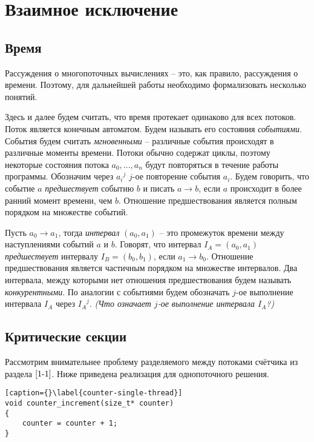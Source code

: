 \section{Взаимное исключение}

\subsection{Время}

Рассуждения о многопоточных вычислениях -- это, как правило, рассуждения о
времени. Поэтому, для дальнейшей работы необходимо формализовать несколько
понятий.

Здесь и далее будем считать, что время протекает одинаково для всех потоков.
Поток является конечным автоматом. Будем называть его состояния
\textit{событиями}. События будем считать \textit{мгновенными} -- различные
события происходят в различные моменты времени. Потоки обычно содержат циклы,
поэтому некоторые состояния потока $a_0,...,a_n$ будут повторяться в течение
работы программы. Обозначим через ${a_{i}}^{j}$ $j$-ое повторение события $a_i$.
Будем говорить, что событие $a$ \textit{предшествует} событию $b$ и писать
$a \rightarrow b$, если $a$ происходит в более ранний момент времени, чем $b$.
Отношение предшествования является полным порядком на множестве событий.

Пусть $a_0 \rightarrow a_1$, тогда \textit{интервал} $(a_0,a_1)$ -- это
промежуток времени между наступлениями событий $a$ и $b$. Говорят, что интервал
$I_A=(a_0,a_1)$ \textit{предшествует} интервалу $I_B=(b_0,b_1)$, если
$a_1 \rightarrow b_0$. Отношение предшествования является частичным порядком на
множестве интервалов. Два интервала, между которыми нет отношения
предшествования будем называть \textit{конкурентными}. По аналогии с событиями
будем обозначать $j$-ое выполнение интервала $I_A$ через ${I_A}^{j}$.
\textit{(Что означает $j$-ое выполнение интервала $I_A$?)}

\subsection{Критические секции}

Рассмотрим внимательнее проблему разделяемого между потоками счётчика из раздела
$\ref{1-1}$. Ниже приведена реализация для однопоточного решения.

\begin{lstlisting}[caption={}\label{counter-single-thread}]
void counter_increment(size_t* counter)
{
    counter = counter + 1;
}
\end{lstlisting}

